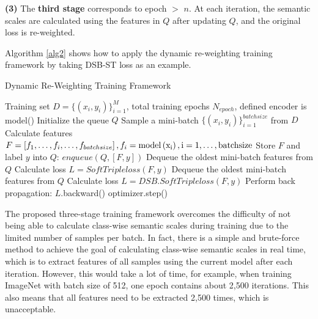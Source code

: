 \documentclass[10pt]{article} %
\begin{document}
\textbf{(3)} The \textbf{third stage} corresponds to epoch $>$ $n$. At each iteration, the semantic scales are calculated using the features in $Q$ after updating $Q$, and the original loss is re-weighted.


Algorithm \ref{alg2} shows how to apply the dynamic re-weighting training framework by taking DSB-ST loss as an example.



\begin{algorithm}[h]
   \caption{Dynamic Re-Weighting Training Framework}
   \label{alg2}
\begin{algorithmic}
    Training set $D = \{ {\left( {{x_i},{y_i}} \right)} \}_{i = 1}^M$, total training epochs $N_{epoch}$, defined encoder is model()
   \STATE Initialize the queue $Q$
   \STATE Sample a mini-batch $\{ {\left( {{x_i},{y_i}} \right)} \}_{i = 1}^{batchsize}$ from $D$
   \STATE Calculate features $F = \left[ {{f_1}, \ldots ,{f_i}, \ldots ,{f_{batchsize}}} \right],{f_i} = \rm{model}\left( {{x_i}} \right),i = 1, \ldots ,batchsize$
   \STATE Store $F$ and label $y$ into $Q$: $enqueue\left( {Q,\left[ {F,y} \right]} \right)$
   \STATE Dequeue the oldest mini-batch features from $Q$
   \ENDIF
   \STATE Calculate loss $L = S\!o\!ftTripleloss\left( {F,y} \right)$
   \ELSE
   \STATE Dequeue the oldest mini-batch features from $Q$
   \STATE Calculate loss $L = D\!S\!B.S\!o\!ftTripleloss\left( {F,y} \right)$
   \ENDIF
   \STATE Perform back propagation: $L$.backward()
   \STATE optimizer.step()
   \ENDFOR
   \ENDFOR
\end{algorithmic}
\end{algorithm}




The proposed three-stage training framework overcomes the difficulty of not being able to calculate class-wise semantic scales during training due to the limited number of samples per batch. In fact, there is a simple and brute-force method to achieve the goal of calculating class-wise semantic scales in real time, which is to extract features of all samples using the current model after each iteration. However, this would take a lot of time, for example, when training ImageNet with batch size of 512, one epoch contains about 2,500 iterations. This also means that all features need to be extracted 2,500 times, which is unacceptable.
\end{document}
